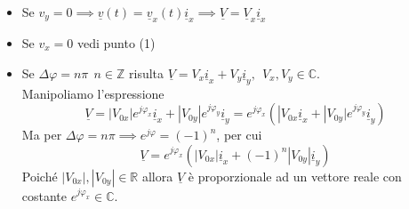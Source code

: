 \documentclass{book}
\begin{document}
        \begin{itemize}
            \item Se $v_{y} = 0 \implies \underline{v}(t)=\underline{v}_{x}(t) \underline{i}_{x} \implies \underline{V} = \underline{V}_{x} \underline{i}_{x}$
            \item Se $v_{x}=0$ vedi punto (1)
            \item Se $\Delta \varphi = n \pi \ \ n \in \mathbb{Z}$ risulta $\underline{V}=V_{x}\underline{i}_{x}+V_{y}\underline{i}_{y}, \ \ V_{x}, V_{y} \in \mathbb{C}$. \\
            Manipoliamo l'espressione
            \begin{equation}
                \underline{V} = |V_{0x}|e^{j \varphi_{x}}\underline{i}_{x}+|V_{0y}|e^{j \varphi_{y}}\underline{i}_{y} = e^{j\varphi_{x}}(|V_{0x}\underline{i}_{x}+|V_{0y}|e^{j \varphi_{y}}\underline{i}_{y})
            \end{equation}
            Ma per $\Delta \varphi = n \pi \implies e^{j \varphi} = (-1)^{n}$, per cui
            \begin{equation}
                \underline{V} = e^{j \varphi_{x}}(|V_{0x}|\underline{i}_{x}+(-1)^{n}|V_{0y}|\underline{i}_{y})
            \end{equation}
            Poiché $|V_{0x}|,|V_{0y}| \in \mathbb{R}$ allora $\underline{V}$ è proporzionale ad un vettore reale con costante $e^{j \varphi_{x}} \in \mathbb{C}$.
        \end{itemize}
\end{document}
